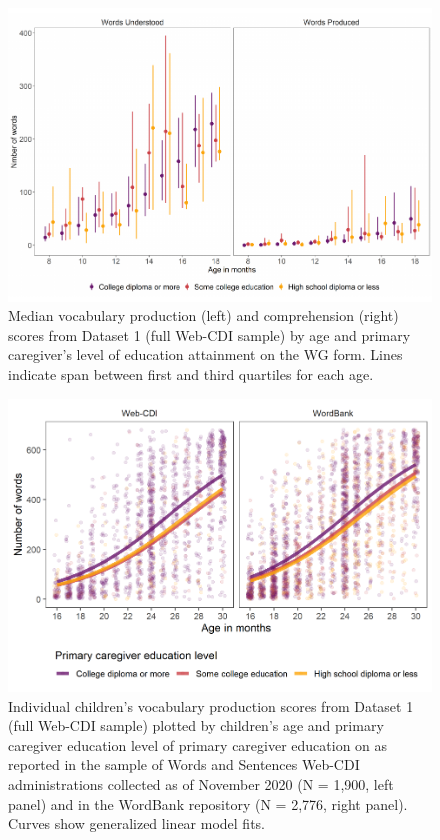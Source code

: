 \documentclass[
  english,
  ,man,floatsintext]{apa6}
\begin{document}
\begin{figure}
\centering
\includegraphics{webcdi_paper_files/figure-latex/wgmedfig-1.pdf}
\caption{\label{fig:wgmedfig}Median vocabulary production (left) and comprehension (right) scores from Dataset 1 (full Web-CDI sample) by age and primary caregiver's level of education attainment on the WG form. Lines indicate span between first and third quartiles for each age.}
\end{figure}

\begin{figure}
\centering
\includegraphics{webcdi_paper_files/figure-latex/wsglm-1.pdf}
\caption{\label{fig:wsglm}Individual children's vocabulary production scores from Dataset 1 (full Web-CDI sample) plotted by children's age and primary caregiver education level of primary caregiver education on as reported in the sample of Words and Sentences Web-CDI administrations collected as of November 2020 (N = 1,900, left panel) and in the WordBank repository (N = 2,776, right panel). Curves show generalized linear model fits.}
\end{figure}
\end{document}
